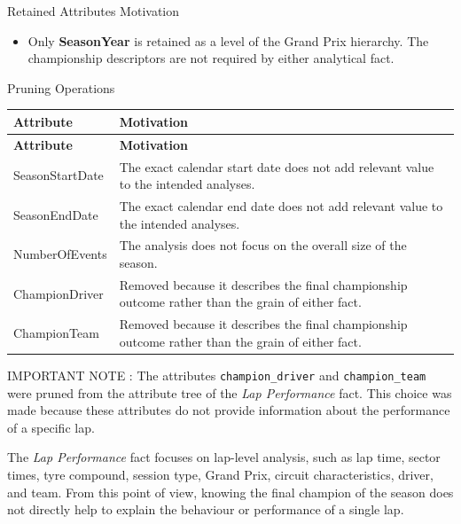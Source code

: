 \documentclass[a4paper,11pt]{article}
\begin{document}
	Retained Attributes Motivation
	
	\begin{itemize}
		
		\item Only \textbf{SeasonYear} is retained as a level of the Grand Prix hierarchy.
		The championship descriptors are not required by either analytical fact.
		
	\end{itemize}
		
	Pruning Operations
	
	\begin{longtable}{|p{4.4cm}|p{10.8cm}|}
		\hline
		\textbf{Attribute} & \textbf{Motivation} \\
		\hline
		\endfirsthead
		
		\hline
		\textbf{Attribute} & \textbf{Motivation} \\
		\hline
		\endhead
		
		SeasonStartDate & The exact calendar start date does not add relevant value to the intended analyses. \\ \hline
		
		SeasonEndDate & The exact calendar end date does not add relevant value to the intended analyses. \\ \hline
		
		NumberOfEvents & The analysis does not focus on the overall size of the season. \\ \hline

		ChampionDriver & Removed because it describes the final championship outcome rather than the grain of either fact. \\ \hline

		ChampionTeam & Removed because it describes the final championship outcome rather than the grain of either fact. \\ \hline
		
	\end{longtable}
	
	IMPORTANT NOTE : 
	The attributes \texttt{champion\_driver} and \texttt{champion\_team} were pruned from
	the attribute tree of the \textit{Lap Performance} fact. This choice was made because
	these attributes do not provide information about the performance of a specific lap.
	
	The \textit{Lap Performance} fact focuses on lap-level analysis, such as lap time, sector
	times, tyre compound, session type, Grand Prix, circuit characteristics, driver, and team.
	From this point of view, knowing the final champion of the season does not directly help
	to explain the behaviour or performance of a single lap.
	
\end{document}
